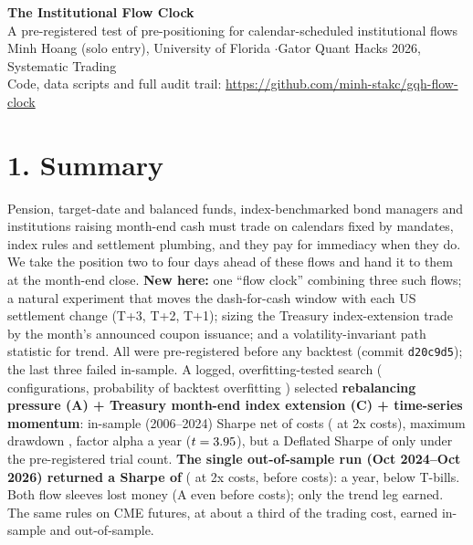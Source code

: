 \documentclass[11pt]{article}
\newcommand{\sect}[1]{\vspace{1pt}\section*{#1}\vspace{-4pt}}
\begin{document}
\pagestyle{plain}

\begin{center}
{\LARGE\bfseries The Institutional Flow Clock}\\[2pt]
{\large A pre-registered test of pre-positioning for calendar-scheduled institutional flows}\\[4pt]
Minh Hoang (solo entry), University of Florida \quad$\cdot$\quad Gator Quant Hacks 2026, Systematic Trading\\
Code, data scripts and full audit trail: \url{https://github.com/minh-stakc/gqh-flow-clock}
\end{center}
\vspace{-8pt}

\sect{1. Summary}
Pension, target-date and balanced funds, index-benchmarked bond managers and institutions raising month-end cash must trade on calendars fixed by mandates, index rules and settlement plumbing, and they pay for immediacy when they do. We take the position two to four days ahead of these flows and hand it to them at the month-end close. \textbf{New here:} one ``flow clock'' combining three such flows; a natural experiment that moves the dash-for-cash window with each US settlement change (T+3, T+2, T+1); sizing the Treasury index-extension trade by the month's announced coupon issuance; and a volatility-invariant path statistic for trend. All were pre-registered before any backtest (commit \texttt{d20c9d5}); the last three failed in-sample. A logged, overfitting-tested search (\nconfigs{} configurations, probability of backtest overfitting \PBO) selected \textbf{rebalancing pressure (A) + Treasury month-end index extension (C) + time-series momentum}: in-sample (2006--2024) Sharpe \textbf{\ISsr} net of costs (\ISsrtwo{} at 2x costs), maximum drawdown \ISdd, factor alpha \ISalpha{} a year ($t=3.95$), but a Deflated Sharpe of only \DSR{} under the pre-registered trial count. \textbf{The single out-of-sample run (Oct 2024--Oct 2026) returned a Sharpe of \OOSsr{}} (\OOSsrtwo{} at 2x costs, \OOSgross{} before costs): \OOSret{} a year, below T-bills. Both flow sleeves lost money (A even before costs); only the trend leg earned. The same rules on CME futures, at about a third of the trading cost, earned \IFCFsr{} in-sample and \IFCFoos{} out-of-sample.
\end{document}
